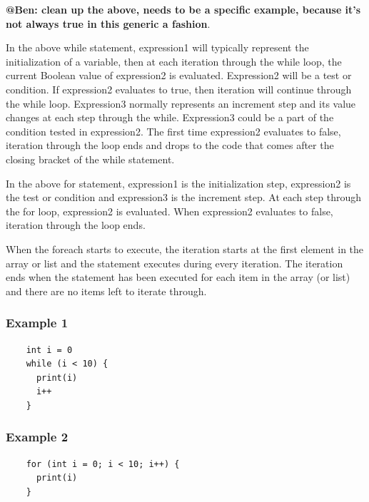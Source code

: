 \documentclass{article}
\begin{document}
\textbf{@Ben: clean up the above, needs to be a specific example, because it's not
always true in this generic a fashion}.

In the above while statement, expression1 will typically represent the
initialization of a variable, then at each iteration through the while loop, the
current Boolean value of expression2 is evaluated. Expression2 will be a test or
condition. If expression2 evaluates to true, then iteration will continue through
the while loop. Expression3 normally represents an increment step and its value
changes at each step through the while. Expression3 could be a part of the
condition tested in expression2. The first time expression2 evaluates to false,
iteration through the loop ends and drops to the code that comes after the closing
bracket of the while statement.

In the above for statement, expression1 is the initialization step, expression2 is
the test or condition and expression3 is the increment step. At each step through
the for loop, expression2 is evaluated. When expression2 evaluates to false,
iteration through the loop ends.

When the foreach starts to execute, the iteration starts at the first element in
the array or list and the statement executes during every iteration. The iteration
ends when the statement has been executed for each item in the array (or list) and
there are no items left to iterate through.

\subsubsection{Example 1} %
\label{ssub:example_1}

\begin{verbatim}
    int i = 0
    while (i < 10) {
      print(i)
      i++
    }
\end{verbatim}


\subsubsection{Example 2} %
\label{ssub:example_2}

\begin{verbatim}
    for (int i = 0; i < 10; i++) {
      print(i)
    }
\end{verbatim}

\end{document}
